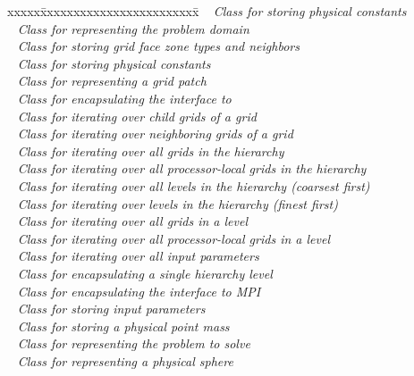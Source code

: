 \documentclass[10pt]{article}
\begin{document}
 \begin{tabbing}
xxxxx\=xxxxxxxxxxxxxxxxxxxxxxxx\=\kill
\> \done\ 
  \> \textit{Class for storing physical constants} \\
\> \done\ 
  \> \textit{Class for representing the problem domain} \\
\> \done\ 
  \> \textit{Class for storing grid face zone types and neighbors} \\
\> \done\ 
  \> \textit{Class for storing physical constants} \\
\> \done\ 
  \> \textit{Class for representing a grid patch} \\
\> \done\ 
  \> \textit{Class for encapsulating the interface to \hypre} \\
\> \done\ 
  \> \textit{Class for iterating over child grids of a grid} \\
\> \done\ 
  \> \textit{Class for iterating over neighboring grids of a grid} \\
\> \done\ 
  \> \textit{Class for iterating over all grids in the hierarchy} \\
\> \done\ 
  \> \textit{Class for iterating over all processor-local grids in the hierarchy} \\
\> \done\ 
  \> \textit{Class for iterating over all levels in the hierarchy (coarsest first)} \\
\> \done\ 
  \> \textit{Class for iterating over levels in the hierarchy (finest first)} \\
\> \done\ 
  \> \textit{Class for iterating over all grids in a level} \\
\> \done\ 
  \> \textit{Class for iterating over all processor-local grids in a level} \\
\> \done\ 
  \> \textit{Class for iterating over all input parameters} \\
\> \done\ 
  \> \textit{Class for encapsulating a single hierarchy level} \\
\> \done\ 
  \> \textit{Class for encapsulating the interface to MPI} \\
\> \done\ 
  \> \textit{Class for storing input parameters} \\
\> \done\ 
  \> \textit{Class for storing a physical point mass} \\
\> \done\ 
  \> \textit{Class for representing the problem to solve} \\
\> \done\ 
  \> \textit{Class for representing a physical sphere}
\end{tabbing}
\end{document}
